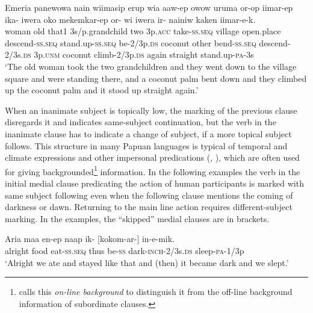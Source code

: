 \ea%
\label{ex:x1480}
\gll Emeria  panewowa  nain  wiimasip  erup  wia  aaw-ep owow  uruma  or-op  iimar-ep  ika- iwera  oko  mekemkar-ep  or-  wi  iwera ir-  nainiw  kaken  iimar-e-k.\\
woman  old  that1  3s/p.grandchild  two  3p.\textsc{acc} take-\textsc{ss}.\textsc{seq} village open.place descend-\textsc{ss}.\textsc{seq} stand.up-\textsc{ss}.\textsc{seq} be-2/3p.\textsc{ds} coconut  other  bend-\textsc{ss}.\textsc{seq} descend-2/3s.\textsc{ds} 3p.\textsc{unm} coconut climb-2/3p.\textsc{ds} again  straight  stand.up-\textsc{pa}-3s\\
\glt`The old woman took the two grandchildren and they went down to the village square and were standing there, and a coconut palm bent down and they climbed up the coconut palm and it stood up straight again.'
\z


When an inanimate subject is topically low, the  marking of the previous clause disregards it and indicates same-subject continuation, but the verb in the inanimate clause has to indicate a change of subject, if a more topical subject follows. This structure in many Papuan languages is typical of temporal and climate expressions and other impersonal predications (\citealt{Reesink1983a}, \citealt{Roberts1988b}), which are often used for giving backgrounded\footnote{\citet[244]{Farr1999} calls this \textit{on-line background} to distinguish it from the off-line background information of subordinate clauses.} information. In the following examples the verb in the initial medial clause predicating the action of human participants is marked with same subject following even when the following clause mentions the coming of darkness or dawn. Returning to the main line action requires different-subject marking. In the examples, the ``skipped'' medial clauses are in brackets.

\ea%
\label{ex:x1482}
\gll Aria  maa  en-ep  naap  ik-  [kokom-ar-] in-e-mik.\\
alright  food  eat-\textsc{ss}.\textsc{seq} thus be-\textsc{ss} dark-\textsc{inch}-2/3s.\textsc{ds} sleep-\textsc{pa}-1/3p\\
\glt`Alright we ate and stayed like that and (then) it became dark and we slept.'
\z


